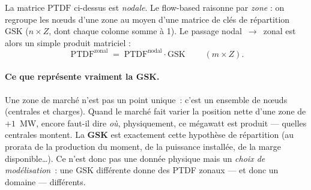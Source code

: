 \documentclass[11pt,a4paper]{article}
\begin{document}
La matrice $\mathrm{PTDF}$ ci-dessus est \emph{nodale}. Le flow-based
raisonne par \emph{zone} : on regroupe les n\oe{}uds d'une zone au moyen
d'une matrice de clés de répartition $\mathrm{GSK}$ ($n\times Z$, dont
chaque colonne somme à 1). Le passage nodal~$\to$~zonal est alors un simple
produit matriciel :
\[
  \boxed{\;\mathrm{PTDF}^{\text{zonal}} \;=\; \mathrm{PTDF}^{\text{nodal}}\cdot \mathrm{GSK}\;}\qquad (m\times Z).
\]

\paragraph{Ce que représente vraiment la GSK.} Une zone de marché n'est pas
un point unique~: c'est un ensemble de n\oe{}uds (centrales et charges).
Quand le marché fait varier la position nette d'une zone de $+1$~MW, encore
faut-il dire \emph{où}, physiquement, ce mégawatt est produit — quelles
centrales montent. La \textbf{GSK} est exactement cette hypothèse de
répartition (au prorata de la production du moment, de la puissance installée,
de la marge disponible\ldots). Ce n'est donc pas une donnée physique mais un
\emph{choix de modélisation}~: une GSK différente donne des PTDF zonaux — et
donc un domaine — différents.

\begin{center}
\end{center}
\end{document}
